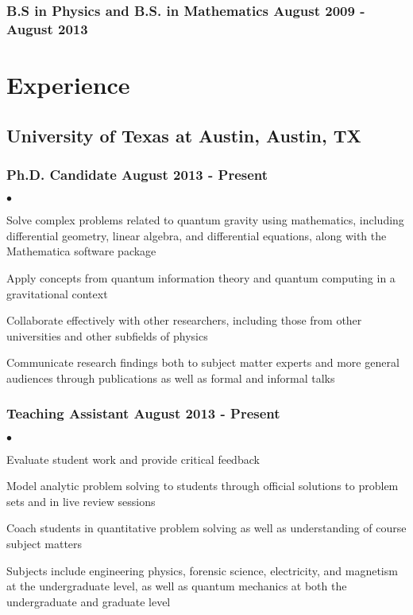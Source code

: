 \documentclass[letterpaper]{article}
\renewenvironment{itemize}{
  \begin{list}{$\bullet$}{
    \setlength{\itemsep}{0em}
    \setlength{\parskip}{0em}
    \setlength{\parsep}{0em} 
    \setlength{\topsep}{0em} 
  }
}{
  \end{list}
}
\begin{document}
\subsubsection*{B.S in Physics and B.S. in Mathematics \hfill August 2009 - August 2013}

\section*{Experience}

\subsection*{University of Texas at Austin, Austin, TX} 
\subsubsection*{Ph.D. Candidate \hfill August 2013 - Present}
    \begin{itemize}
        
        \item Solve complex problems related to quantum gravity using mathematics, including differential geometry, linear algebra, and differential equations, along with the Mathematica software package
        \item Apply concepts from quantum information theory and quantum computing in a gravitational context
        \item Collaborate effectively with other researchers, including those from other universities and other subfields of physics
        \item Communicate research findings both to subject matter experts and more general audiences through publications as well as formal and informal talks
        
    \end{itemize}
    
\subsubsection*{Teaching Assistant \hfill August 2013 - Present}
    \begin{itemize}
    
        \item Evaluate student work and provide critical feedback
        \item Model analytic problem solving to students through official solutions to problem sets and in live review sessions
        \item Coach students in quantitative problem solving as well as understanding of course subject matters
        \item Subjects include engineering physics, forensic science, electricity, and magnetism at the undergraduate level, as well as quantum mechanics at both the undergraduate and graduate level
        
    \end{itemize}
    
\end{document}
